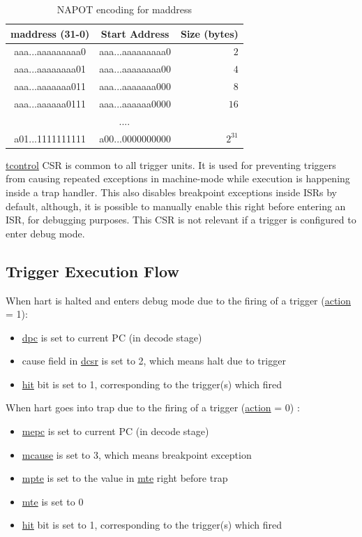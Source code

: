 \documentclass[main\_\_EN.tex]{subfiles}
\begin{document}
\begin{longtable}{ | c | c | r | }
\caption{NAPOT encoding for maddress} \label{tab:riscvcpu-hwt-table}
\\ \hline
\rowcolor{lightgray}
maddress (31-0) & Start Address & Size (bytes) \\ \hline
aaa...aaaaaaaaa0 & aaa...aaaaaaaaa0 & $2$ \\ \hline
aaa...aaaaaaaa01 & aaa...aaaaaaaa00 & $4$ \\ \hline
aaa...aaaaaaa011 & aaa...aaaaaaa000 & $8$ \\ \hline
aaa...aaaaaa0111 & aaa...aaaaaa0000 & $16$ \\ \hline
\multicolumn{3}{c}{....} \\ \hline
a01...1111111111 & a00...0000000000 & $2^{31}$ \\ \hline
\end{longtable}

\hyperref[regdesc:TCONTROL]{tcontrol} CSR is common to all trigger units. It is used for preventing triggers from causing repeated exceptions in machine-mode while execution is happening inside a trap handler. This also disables breakpoint exceptions inside ISRs by default, although, it is possible to manually enable this right before entering an ISR, for debugging purposes. This CSR is not relevant if a trigger is configured to enter debug mode.

\subsection{Trigger Execution Flow}
\label{sec:riscvcpu-hwt-suggest-op}

When hart is halted and enters debug mode due to the firing of a trigger (\hyperref[fielddesc:MCONTROLACTION]{action} = 1):
\begin{itemize}
    \item \hyperref[regdesc:DPC]{dpc} is set to current PC (in decode stage)
    \item cause field in \hyperref[regdesc:DCSR]{dcsr} is set to 2, which means halt due to trigger
    \item \hyperref[fielddesc:MCONTROLHIT]{hit} bit is set to 1, corresponding to the trigger(s) which fired
\end{itemize}

When hart goes into trap due to the firing of a trigger (\hyperref[fielddesc:MCONTROLACTION]{action} = 0) :
\begin{itemize}
    \item \hyperref[regdesc:MEPC]{mepc} is set to current PC (in decode stage)
    \item \hyperref[regdesc:MCAUSE]{mcause} is set to 3, which means breakpoint exception
    \item \hyperref[fielddesc:TCONTROLMPTE]{mpte} is set to the value in \hyperref[fielddesc:TCONTROLMTE]{mte} right before trap
    \item \hyperref[fielddesc:TCONTROLMTE]{mte} is set to 0
    \item \hyperref[fielddesc:MCONTROLHIT]{hit} bit is set to 1, corresponding to the trigger(s) which fired
\end{itemize}
\end{document}
